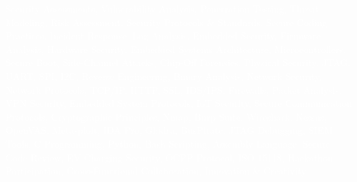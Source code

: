 \documentclass{resume} %
\begin{document}

\textcolor{white}{\fontsize{1}{1.2}\selectfont
Security Assessments, Vulnerability Analysis, Penetration Testing, Threat Modeling, Risk Assessment, Security Protocols \& Standards, Secure Coding Practices, Incident Response, Log Analysis, Embedded Security, Firmware Analysis, Hardware Security, Embedded Systems Architecture, Microcontrollers, Secure Boot, Side-Channel Attacks, Chip-Off Forensics, Physical Security, JTAG, UART, SPI, I2C, Reverse Engineering, Binary Analysis, Network Security, Network Protocols, TCP/IP, HTTP, SSL, IDS/IPS, Firewalls, Packet Analysis, VPN Security, Embedded System Protocols, IoT Security, Secure Communication Protocols, Cryptographic Principles, Nmap, Burp Suite, Wireshark, Nessus, OpenVAS, Metasploit, IDA Pro, Ghidra, BusPirate, JTAG Debugging, SIEM Tools, C Programming, Python, Bash Scripting, Assembly Language, Secure Code Review, EV Charging Security, OCPP Protocol, ISO 15118, Hackathon Participation, Cross-Functional Collaboration, Innovation \& Creativity}
\end{document}
